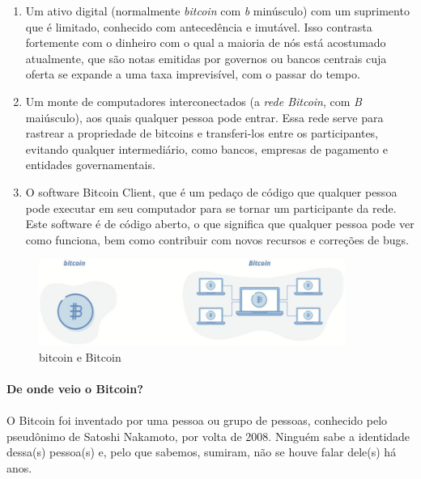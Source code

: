 \begin{samepage}
\begin{enumerate}
\item Um ativo digital (normalmente \textit{bitcoin} com \textit{b} minúsculo) com um suprimento que é limitado, conhecido com antecedência e imutável. Isso contrasta fortemente com o dinheiro com o qual a maioria de nós está acostumado atualmente, que são notas emitidas por governos ou bancos centrais cuja oferta se expande a uma taxa imprevisível, com o passar do tempo.
\item Um monte de computadores interconectados (a \textit{rede Bitcoin}, com \textit{B} maiúsculo), aos quais qualquer pessoa pode entrar. Essa rede serve para rastrear a propriedade de bitcoins e transferi-los entre os participantes, evitando qualquer intermediário, como bancos, empresas de pagamento e entidades governamentais.
\item O software Bitcoin Client, que é um pedaço de código que qualquer pessoa pode executar em seu computador para se tornar um participante da rede. Este software é de código aberto, o que significa que qualquer pessoa pode ver como funciona, bem como contribuir com novos recursos e correções de bugs.
\end{enumerate}
\end{samepage}

\newpage

\begin{figure}
  \centering
  \includegraphics[width=10cm]{imagens/bitcoin-capitulo-1.png}
  \caption{bitcoin e Bitcoin}
\end{figure}
  
\newpage
\paragraph{De onde veio o Bitcoin?}
\paragraph{}

O Bitcoin foi inventado por uma pessoa ou grupo de pessoas, conhecido pelo pseudônimo de Satoshi Nakamoto, por volta de 2008. Ninguém sabe a identidade dessa(s) pessoa(s) e, pelo que sabemos, sumiram, não se houve falar dele(s) há anos.


